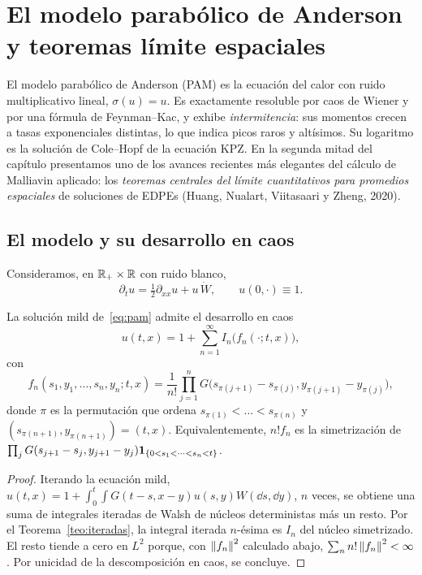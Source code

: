 \chapter{El modelo parabólico de Anderson y teoremas límite espaciales}\label{cap:anderson}

\begin{panorama}
El modelo parabólico de Anderson (PAM) es la ecuación del calor con ruido multiplicativo
lineal, $\sigma(u)=u$. Es exactamente resoluble por caos de Wiener y por una fórmula
de Feynman--Kac, y exhibe \emph{intermitencia}: sus momentos crecen a tasas exponenciales
distintas, lo que indica picos raros y altísimos. Su logaritmo es la solución de Cole--Hopf
de la ecuación KPZ. En la segunda mitad del capítulo presentamos uno de los avances
recientes más elegantes del cálculo de Malliavin aplicado: los \emph{teoremas centrales del
límite cuantitativos para promedios espaciales} de soluciones de EDPEs (Huang, Nualart,
Viitasaari y Zheng, 2020).
\end{panorama}

\section{El modelo y su desarrollo en caos}
Consideramos, en $\mathbb{R}_+\times\mathbb{R}$ con ruido blanco,
\begin{equation}\label{eq:pam}
  \partial_tu=\tfrac12\partial_{xx}u+u\,\dot W,\qquad u(0,\cdot)\equiv1.
\end{equation}

\begin{teorema}
La solución mild de~\eqref{eq:pam} admite el desarrollo en caos
\[
  u(t,x)=1+\sum_{n=1}^\infty I_n\big(f_n(\cdot;t,x)\big),
\]
con
\[
  f_n(s_1,y_1,\dots,s_n,y_n;t,x)=\frac1{n!}\prod_{j=1}^nG\big(s_{\pi(j+1)}-s_{\pi(j)},y_{\pi(j+1)}-y_{\pi(j)}\big),
\]
donde $\pi$ es la permutación que ordena $s_{\pi(1)}<\dots<s_{\pi(n)}$ y $(s_{\pi(n+1)},y_{\pi(n+1)})=(t,x)$.
Equivalentemente, $n!f_n$ es la simetrización de $\prod_jG(s_{j+1}-s_j,y_{j+1}-y_j)\mathbf{1}_{\{0<s_1<\dots<s_n<t\}}$.
\end{teorema}

\begin{proof}
Iterando la ecuación mild, $u(t,x)=1+\int_0^t\int G(t-s,x-y)u(s,y)W(\dd s,\dd y)$, $n$
veces, se obtiene una suma de integrales iteradas de Walsh de núcleos deterministas más un
resto. Por el Teorema~\ref{teo:iteradas}, la integral iterada $n$-ésima es $I_n$ del núcleo simetrizado. El resto
tiende a cero en $L^2$ porque, con $\left\lVert f_n\right\rVert^2$ calculado abajo, $\sum_nn!\left\lVert f_n\right\rVert^2<\infty$. Por unicidad de la
descomposición en caos, se concluye.
\end{proof}


